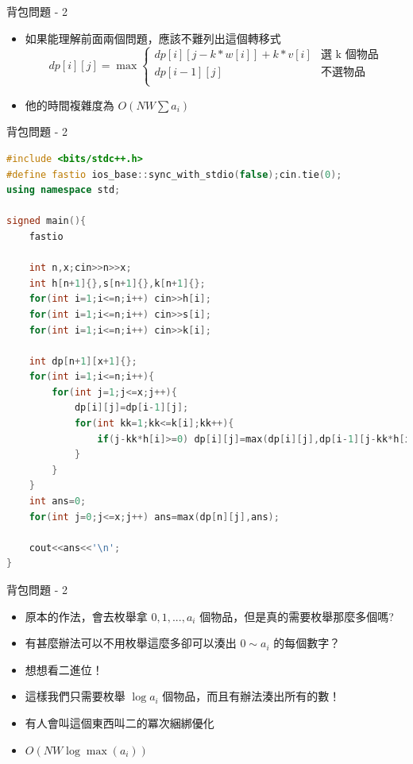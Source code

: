 \documentclass[aspectratio=169]{beamer}
\begin{document}
    \begin{frame}{背包問題 - 2}
        \begin{itemize}
            \item 如果能理解前面兩個問題，應該不難列出這個轉移式
            $$
            dp[i][j]= \max
            \begin{cases}
                dp[i][j-k*w[i]]+k*v[i] & \text{選 k 個物品} \\
                dp[i-1][j]           & \text{不選物品} \\
            \end{cases}
            $$
            \item 他的時間複雜度為 $O(NW\sum a_i)$
        \end{itemize}
    \end{frame}
    
    \begin{frame}[fragile]{背包問題 - 2}
        \begin{lstlisting}[language=C++,basicstyle=\ttfamily\tiny]
#include <bits/stdc++.h>
#define fastio ios_base::sync_with_stdio(false);cin.tie(0);
using namespace std;

signed main(){
    fastio

    int n,x;cin>>n>>x;
    int h[n+1]{},s[n+1]{},k[n+1]{};
    for(int i=1;i<=n;i++) cin>>h[i];
    for(int i=1;i<=n;i++) cin>>s[i];
    for(int i=1;i<=n;i++) cin>>k[i];

    int dp[n+1][x+1]{};
    for(int i=1;i<=n;i++){
        for(int j=1;j<=x;j++){
            dp[i][j]=dp[i-1][j];
            for(int kk=1;kk<=k[i];kk++){
                if(j-kk*h[i]>=0) dp[i][j]=max(dp[i][j],dp[i-1][j-kk*h[i]]+kk*s[i]);
            }
        }
    }
    int ans=0;
    for(int j=0;j<=x;j++) ans=max(dp[n][j],ans);

    cout<<ans<<'\n';
}
        \end{lstlisting}
    \end{frame}

    \begin{frame}{背包問題 - 2}
        \begin{itemize}
            \item 原本的作法，會去枚舉拿 $0,1,...,a_i$ 個物品，但是真的需要枚舉那麼多個嗎?
            \item<2-> 有甚麼辦法可以不用枚舉這麼多卻可以湊出 $0 \sim a_i$ 的每個數字？
            \item<3-> 想想看二進位！
            \item<4-> 這樣我們只需要枚舉 $\log a_i$ 個物品，而且有辦法湊出所有的數！
            \item<5-> 有人會叫這個東西叫二的冪次綑綁優化
            \item<6-> $O(NW \log \max(a_i))$
        \end{itemize}
    \end{frame}
\end{document}
